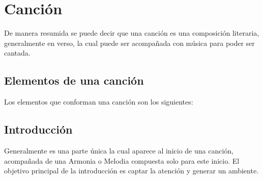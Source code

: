 \documentclass[12pt, a4paper, titlepage]{report}
\begin{document}
		  \newpage
	    \section{Canción}
	    De manera resumida se puede decir que una canción es una composición literaria, generalmente en verso, la cual puede ser acompañada con música para poder ser cantada.\cite{refEstructuraCancion1}\par
			\subsection{Elementos de una canción}
			Los elementos que conforman una canción son los siguientes:
			\subsection{Introducción}
			Generalmente es una parte única la cual aparece al inicio de una canción, acompañada de una \Gls{Armonia} o \Gls{Melodia} compuesta solo para este inicio. El objetivo principal de la introducción es captar la atención y generar un ambiente.\cite{refEstructuraCancion2}\par
\end{document}
